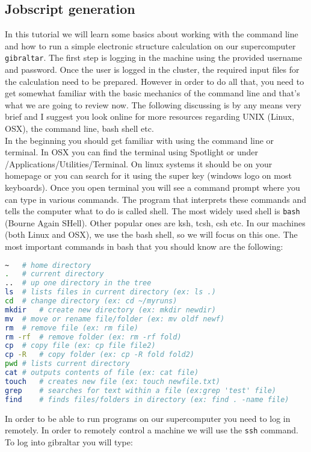\documentclass[a4paper,12pt]{assignment}
\begin{document}
\subsection{Jobscript generation}










In this tutorial we will learn some basics about working with the command line and how to run a simple electronic structure calculation on our supercomputer \texttt{gibraltar}. The first step is logging in the machine using the provided username and password. Once the user is logged in the cluster, the required input files for the calculation need to be prepared. However in order to do all that, you need to get somewhat familiar with the basic mechanics of the command line and that's what we are going to review now. The following discussing is by any means very brief and I suggest you look online for more resources regarding UNIX (Linux, OSX), the command line, bash shell etc. \\

In the beginning you should get familiar with using the command line or terminal. In OSX you can find the terminal using Spotlight or under /Applications/Utilities/Terminal. On linux systems it should be on your homepage or you can search for it using the super key (windows logo on most keyboards). Once you open terminal you will see a command prompt where you can type in various commands. The program that interprets these commands and tells the computer what to do is called shell. The most widely used shell is \texttt{bash} (Bourne Again SHell). Other popular ones are ksh, tcsh, csh etc. In our machines (both Linux and OSX), we use the bash shell, so we will focus on this one. The most important commands in bash that you should know are the following:

\begin{lstlisting}[language=bash,caption={Basic bash commands},frame=trBL]
~	# home directory
.	# current directory
..	# up one directory in the tree
ls	# lists files in current directory (ex: ls .)
cd	# change directory (ex: cd ~/myruns)
mkdir	# create new directory (ex: mkdir newdir)
mv	# move or rename file/folder (ex: mv oldf newf)
rm	# remove file (ex: rm file)
rm -rf	# remove folder (ex: rm -rf fold)
cp	# copy file (ex: cp file file2)
cp -R	# copy folder (ex: cp -R fold fold2)
pwd	# lists current directory
cat	# outputs contents of file (ex: cat file)
touch	# creates new file (ex: touch newfile.txt)
grep	# searches for text within a file (ex:grep 'test' file)
find	# finds files/folders in directory (ex: find . -name file)
\end{lstlisting}
\clearpage
In order to be able to run programs on our supercomputer you need to log in remotely. In order to remotely control a machine we will use the \texttt{ssh} command. To log into gibraltar you will type:
\end{document}
